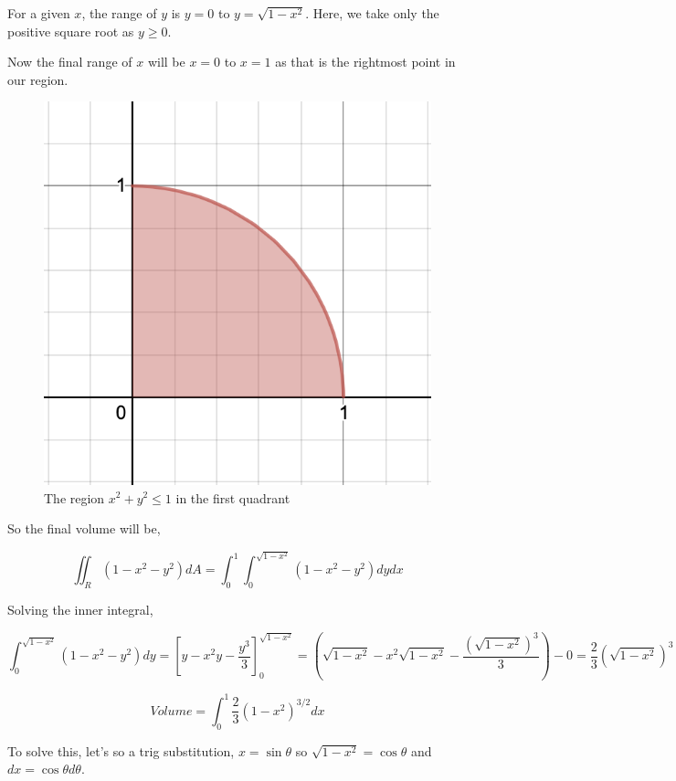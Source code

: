For a given $x$, the range of $y$ is $y = 0$ to $y = \sqrt{1 - x^2}$. 
Here, we take only the positive square root as $y \geq 0$.

Now the final range of $x$ will be $x = 0$ to $x = 1$ as that is the rightmost point in our region.

\begin{figure}[ht!]
    \centering
    \includegraphics[scale=0.5]{./images/lecture_11_figure_2.png}
    \caption{The region $x^2 + y^2 \leq 1$ in the first quadrant}
\end{figure}

So the final volume will be,

$$ \iint_R (1-x^2-y^2) dA = \int_0^1 \int_0^{\sqrt{1-x^2}} (1-x^2-y^2) dy dx $$

Solving the inner integral, 

$$ \int_0^{\sqrt{1-x^2}} (1-x^2-y^2) dy 
    = \left[ y - x^2y - \frac{y^3}{3} \right]_0^{\sqrt{1-x^2}}
    = \left( \sqrt{1-x^2} - x^2\sqrt{1-x^2} - \frac{(\sqrt{1-x^2})^3}{3} \right) - 0
    = \frac{2}{3} (\sqrt{1-x^2})^3
$$ 

$$
Volume = \int_0^1 \frac{2}{3} (1-x^2)^{3/2} dx 
$$

To solve this, let's so a trig substitution, $x = \sin \theta$ so $\sqrt{1-x^2} = \cos \theta$ and $dx = \cos \theta d\theta$.

